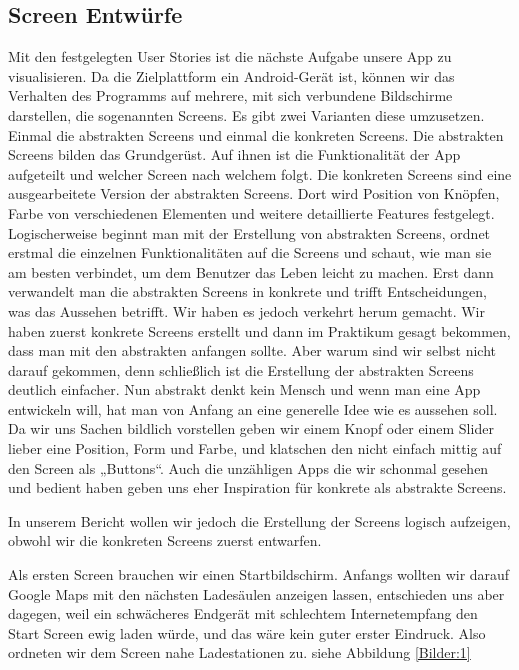 \documentclass[utf8]{lni}
\begin{document}
\subsection{Screen Entwürfe}

Mit den festgelegten User Stories ist die nächste Aufgabe unsere App zu visualisieren. Da die Zielplattform ein Android-Gerät ist, können wir das Verhalten des Programms auf mehrere, mit sich verbundene Bildschirme darstellen, die sogenannten Screens. Es gibt zwei Varianten diese umzusetzen. Einmal die abstrakten Screens und einmal die konkreten Screens. Die abstrakten Screens bilden das Grundgerüst. Auf ihnen ist die Funktionalität der App aufgeteilt und welcher Screen nach welchem folgt. Die konkreten Screens sind eine ausgearbeitete Version der abstrakten Screens. Dort wird Position von Knöpfen, Farbe von verschiedenen Elementen und weitere detaillierte Features festgelegt. Logischerweise beginnt man mit der Erstellung von abstrakten Screens, ordnet erstmal die einzelnen Funktionalitäten auf die Screens und schaut, wie man sie am besten verbindet, um dem Benutzer das Leben leicht zu machen. Erst dann verwandelt man die abstrakten Screens in konkrete und trifft Entscheidungen, was das Aussehen betrifft.
Wir haben es jedoch verkehrt herum gemacht. Wir haben zuerst konkrete Screens erstellt und dann im Praktikum gesagt bekommen, dass man mit den abstrakten anfangen sollte. Aber warum sind wir selbst nicht darauf gekommen, denn schließlich ist die Erstellung der abstrakten Screens deutlich einfacher. Nun abstrakt denkt kein Mensch und wenn man eine App entwickeln will, hat man von Anfang an eine generelle Idee wie es aussehen soll. Da wir uns Sachen bildlich vorstellen geben wir einem Knopf oder einem Slider lieber eine Position, Form und Farbe, und klatschen den nicht einfach mittig auf den Screen als „Buttons“. Auch die unzähligen Apps die wir schonmal gesehen und bedient haben geben uns eher Inspiration für konkrete als abstrakte Screens.

In unserem Bericht wollen wir jedoch die Erstellung der Screens logisch aufzeigen, obwohl wir die konkreten Screens zuerst entwarfen.

Als ersten Screen brauchen wir einen Startbildschirm. Anfangs wollten wir darauf Google Maps mit den nächsten Ladesäulen anzeigen lassen, entschieden uns aber dagegen, weil ein schwächeres Endgerät mit schlechtem Internetempfang den Start Screen ewig laden würde, und das wäre kein guter erster Eindruck. Also ordneten wir dem Screen nahe Ladestationen zu. siehe Abbildung \ref{Bilder:1}
\end{document}
